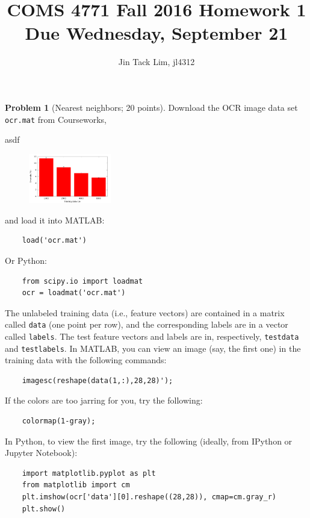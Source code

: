 \documentclass[11pt]{article}
\title{COMS 4771 Fall 2016 Homework 1 \\ Due Wednesday, September 21}
\author{Jin Tack Lim, jl4312
  }
\date{%
  }
\theoremstyle{definition}
\newtheorem{problem}{Problem}
\begin{document}
\maketitle

\newpage


\begin{problem}[Nearest neighbors; 20 points]
  \label{prob:nn}
  Download the OCR image data set \texttt{ocr.mat} from Courseworks,

asdf~\cite{gnuplot-so}
\begin {figure}
    \includegraphics[width=0.32\textwidth]{figures/fig1}
\end {figure}


  and load it into MATLAB:
  \lstset{language=Matlab}
  \begin{lstlisting}
    load('ocr.mat')
  \end{lstlisting}
  Or Python:
  \lstset{language=Python}
  \begin{lstlisting}
    from scipy.io import loadmat
    ocr = loadmat('ocr.mat')
  \end{lstlisting}

  The unlabeled training data (i.e., feature vectors) are contained in
  a matrix called \texttt{data} (one point per row), and the
  corresponding labels are in a vector called \texttt{labels}.
  The test feature vectors and labels are in, respectively,
  \texttt{testdata} and \texttt{testlabels}.
  In MATLAB, you can view an image (say, the first one) in the
  training data with the following commands:
  \lstset{language=Matlab}
  \begin{lstlisting}
    imagesc(reshape(data(1,:),28,28)');
  \end{lstlisting}
  If the colors are too jarring for you, try the following:
  \begin{lstlisting}
    colormap(1-gray);
  \end{lstlisting}
  In Python, to view the first image, try the following (ideally, from
  IPython or Jupyter Notebook):
  \lstset{language=Python}
  \begin{lstlisting}
    import matplotlib.pyplot as plt
    from matplotlib import cm
    plt.imshow(ocr['data'][0].reshape((28,28)), cmap=cm.gray_r)
    plt.show()
  \end{lstlisting}


\end{problem}
\end{document}
